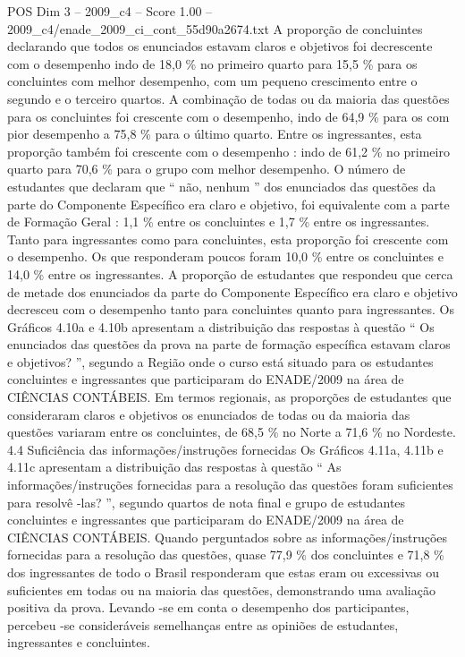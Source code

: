 \begin{textsample}{POS Dim 3 – 2009\_c4 – Score 1.00 – 2009\_c4/enade\_2009\_ci\_cont\_55d90a2674.txt}
A proporção de concluintes declarando que todos os enunciados estavam claros e objetivos foi decrescente com o desempenho indo de 18,0 \% no primeiro quarto para 15,5 \% para os concluintes com melhor desempenho, com um pequeno crescimento entre o segundo e o terceiro quartos.
A combinação de todas ou da maioria das questões para os concluintes foi crescente com o desempenho, indo de 64,9 \% para os com pior desempenho a 75,8 \% para o último quarto.
Entre os ingressantes, esta proporção também foi crescente com o desempenho : indo de 61,2 \% no primeiro quarto para 70,6 \% para o grupo com melhor desempenho.
O número de estudantes que declaram que “ não, nenhum ” dos enunciados das questões da parte do Componente Específico era claro e objetivo, foi equivalente com a parte de Formação Geral : 1,1 \% entre os concluintes e 1,7 \% entre os ingressantes.
Tanto para ingressantes como para concluintes, esta proporção foi crescente com o desempenho.
Os que responderam poucos foram 10,0 \% entre os concluintes e 14,0 \% entre os ingressantes.
A proporção de estudantes que respondeu que cerca de metade dos enunciados da parte do Componente Específico era claro e objetivo decresceu com o desempenho tanto para concluintes quanto para ingressantes.
Os Gráficos 4.10a e 4.10b apresentam a distribuição das respostas à questão “ Os enunciados das questões da prova na parte de formação específica estavam claros e objetivos? ”, segundo a Região onde o curso está situado para os estudantes concluintes e ingressantes que participaram do ENADE/2009 na área de CIÊNCIAS CONTÁBEIS.
Em termos regionais, as proporções de estudantes que consideraram claros e objetivos os enunciados de todas ou da maioria das questões variaram entre os concluintes, de 68,5 \% no Norte a 71,6 \% no Nordeste. 4.4 Suficiência das informações/instruções fornecidas Os Gráficos 4.11a, 4.11b e 4.11c apresentam a distribuição das respostas à questão “ As informações/instruções fornecidas para a resolução das questões foram suficientes para resolvê -las? ”, segundo quartos de nota final e grupo de estudantes concluintes e ingressantes que participaram do ENADE/2009 na área de CIÊNCIAS CONTÁBEIS.
Quando perguntados sobre as informações/instruções fornecidas para a resolução das questões, quase 77,9 \% dos concluintes e 71,8 \% dos ingressantes de todo o Brasil responderam que estas eram ou excessivas ou suficientes em todas ou na maioria das questões, demonstrando uma avaliação positiva da prova.
Levando -se em conta o desempenho dos participantes, percebeu -se consideráveis semelhanças entre as opiniões de estudantes, ingressantes e concluintes.

\end{textsample}
